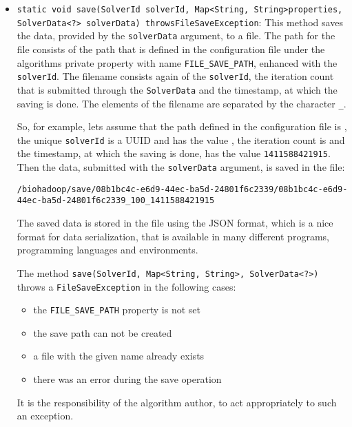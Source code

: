   \begin{itemize}
    \item \texttt{static void save(SolverId solverId, Map<String, String>\newline properties, SolverData<?> solverData) throws\newline FileSaveException}: This method saves the data, provided by the \texttt{solverData} argument, to a file. The path for the file consists of the path that is defined in the configuration file under the algorithms private property with name \texttt{FILE\_SAVE\_PATH}, enhanced with the \texttt{solverId}. The filename consists again of the \texttt{solverId}, the iteration count that is submitted through the \texttt{SolverData} and the timestamp, at which the saving is done. The elements of the filename are separated by the character \texttt{\_}.
    
    So, for example, lets assume that the path defined in the configuration file is , the unique \texttt{solverId} is a UUID and has the value , the iteration count is  and the timestamp, at which the saving is done, has the value \texttt{1411588421915}. Then the data, submitted with the \texttt{solverData} argument, is saved in the file:   
    \begin{lstlisting}
/biohadoop/save/08b1bc4c-e6d9-44ec-ba5d-24801f6c2339/08b1bc4c-e6d9-44ec-ba5d-24801f6c2339_100_1411588421915
    \end{lstlisting}
    
    The saved data is stored in the file using the JSON format, which is a nice format for data serialization, that is available in many different programs, programming languages and environments.
    
    The method \texttt{save(SolverId, Map<String, String>, SolverData<?>)} throws a \texttt{FileSaveException} in the following cases:
    \begin{itemize}
      \item the \texttt{FILE\_SAVE\_PATH} property is not set
      \item the save path can not be created
      \item a file with the given name already exists
      \item there was an error during the save operation
    \end{itemize}
    It is the responsibility of the algorithm author, to act appropriately to such an exception.
  \end{itemize}
  
